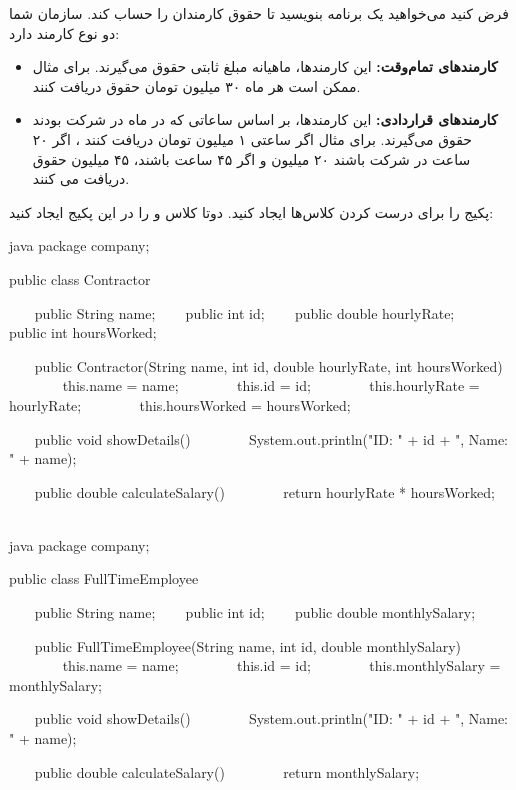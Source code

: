 فرض کنید می‌خواهید یک برنامه بنویسید تا حقوق کارمندان را حساب کند. سازمان
شما دو نوع کارمند دارد:

\begin{itemize}
\tightlist
\item
  \textbf{کارمندهای تمام‌وقت:} این کارمندها، ماهیانه مبلغ ثابتی حقوق
  می‌گیرند. برای مثال ممکن است هر ماه ۳۰ میلیون تومان حقوق دریافت کنند.
\item
  \textbf{کارمندهای قراردادی:} این کارمندها، بر اساس ساعاتی که در ماه در
  شرکت بودند حقوق می‌گیرند. برای مثال اگر ساعتی ۱ میلیون تومان دریافت
  کنند ، اگر ۲۰ ساعت در شرکت باشند ۲۰ میلیون و اگر ۴۵ ساعت باشند، ۴۵
  میلیون حقوق دریافت می کنند.
\end{itemize}

پکیج  را برای درست کردن کلاس‌ها ایجاد کنید. دوتا
کلاس  و  را در این
پکیج ایجاد کنید:

\begin{codebox}{java}
package company;

public class Contractor {
    public String name;
    public int id;
    public double hourlyRate;
    public int hoursWorked;

    public Contractor(String name, int id, double hourlyRate, int hoursWorked) {
        this.name = name;
        this.id = id;
        this.hourlyRate = hourlyRate;
        this.hoursWorked = hoursWorked;  
    }

    public void showDetails() {  
        System.out.println("ID: " + id + ", Name: " + name);  
    }

    public double calculateSalary() {
        return hourlyRate * hoursWorked;  
    }  
}
\end{codebox}

\begin{codebox}{java}
package company;

public class FullTimeEmployee {
    public String name;
    public int id;
    public double monthlySalary;

    public FullTimeEmployee(String name, int id, double monthlySalary) {
        this.name = name;
        this.id = id;
        this.monthlySalary = monthlySalary;  
    }

    public void showDetails() {  
        System.out.println("ID: " + id + ", Name: " + name);  
    }

    public double calculateSalary() {
        return monthlySalary;  
    }  
}
\end{codebox}

